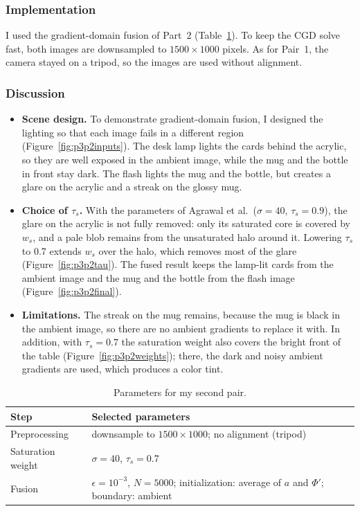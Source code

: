 \documentclass[11pt]{article}
\begin{document}
\subsubsection*{Implementation}
I used the gradient-domain fusion of Part~2 (Table~\ref{tab:p3p2params}). To keep the CGD solve fast, both images are downsampled to $1500\times1000$ pixels. As for Pair~1, the camera stayed on a tripod, so the images are used without alignment.

\subsubsection*{Discussion}

\begin{itemize}\setlength{\itemsep}{0pt}
\item \textbf{Scene design.} To demonstrate gradient-domain fusion, I designed the lighting so that each image fails in a different region (Figure~\ref{fig:p3p2inputs}). The desk lamp lights the cards behind the acrylic, so they are well exposed in the ambient image, while the mug and the bottle in front stay dark. The flash lights the mug and the bottle, but creates a glare on the acrylic and a streak on the glossy mug.

\item \textbf{Choice of $\tau_s$.} With the parameters of Agrawal et al.\ ($\sigma=40$, $\tau_s=0.9$), the glare on the acrylic is not fully removed: only its saturated core is covered by $w_s$, and a pale blob remains from the unsaturated halo around it. Lowering $\tau_s$ to 0.7 extends $w_s$ over the halo, which removes most of the glare (Figure~\ref{fig:p3p2tau}). The fused result keeps the lamp-lit cards from the ambient image and the mug and the bottle from the flash image (Figure~\ref{fig:p3p2final}).

\item \textbf{Limitations.} The streak on the mug remains, because the mug is black in the ambient image, so there are no ambient gradients to replace it with. In addition, with $\tau_s=0.7$ the saturation weight also covers the bright front of the table (Figure~\ref{fig:p3p2weights}); there, the dark and noisy ambient gradients are used, which produces a color tint.
\end{itemize}

\begin{table}[!htbp]
\centering
\small
\begin{tabular}{ll}
\toprule
Step & Selected parameters \\
\midrule
Preprocessing & downsample to $1500\times1000$; no alignment (tripod) \\
Saturation weight & $\sigma=40$, $\tau_s=0.7$ \\
Fusion & $\epsilon=10^{-3}$, $N=5000$; initialization: average of $a$ and $\Phi'$; boundary: ambient \\
\bottomrule
\end{tabular}
\caption{Parameters for my second pair.}
\label{tab:p3p2params}
\end{table}
\end{document}
